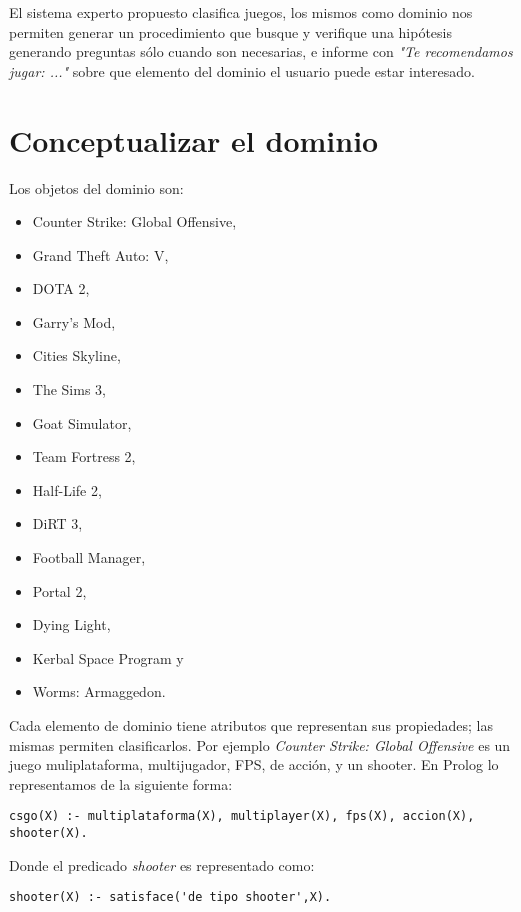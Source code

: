 \documentclass[11pt,oneside,a4paper]{article}
\begin{document}
El sistema experto propuesto clasifica juegos, los mismos como 
dominio nos permiten generar un procedimiento que busque y verifique
una hipótesis generando preguntas sólo cuando son necesarias, e informe con          %
\emph{"Te recomendamos jugar: ..."} sobre que elemento del dominio el
usuario puede estar interesado.


\section{Conceptualizar el dominio}

Los objetos del dominio son:

\begin{multicols}{2}
\begin{itemize}
\item Counter Strike: Global Offensive,
\item Grand Theft Auto: V,
\item DOTA 2,
\item Garry's Mod,
\item Cities Skyline,
\item The Sims 3,
\item Goat Simulator,
\item Team Fortress 2,
\item Half-Life 2,
\item DiRT 3,
\item Football Manager,
\item Portal 2,
\item Dying Light,
\item Kerbal Space Program y
\item Worms: Armaggedon.
\end{itemize}
\end{multicols}

Cada elemento de dominio tiene atributos que representan sus propiedades; las
mismas permiten clasificarlos. Por ejemplo \emph{Counter Strike: Global Offensive}
es un juego muliplataforma, multijugador, FPS, de acción, y un shooter. En Prolog 
lo representamos de la siguiente forma:

\begin{verbatim}
csgo(X) :- multiplataforma(X), multiplayer(X), fps(X), accion(X), shooter(X).
\end{verbatim}

Donde el predicado \emph{shooter} es representado como:

\begin{verbatim}
shooter(X) :- satisface('de tipo shooter',X).
\end{verbatim}
\end{document}
